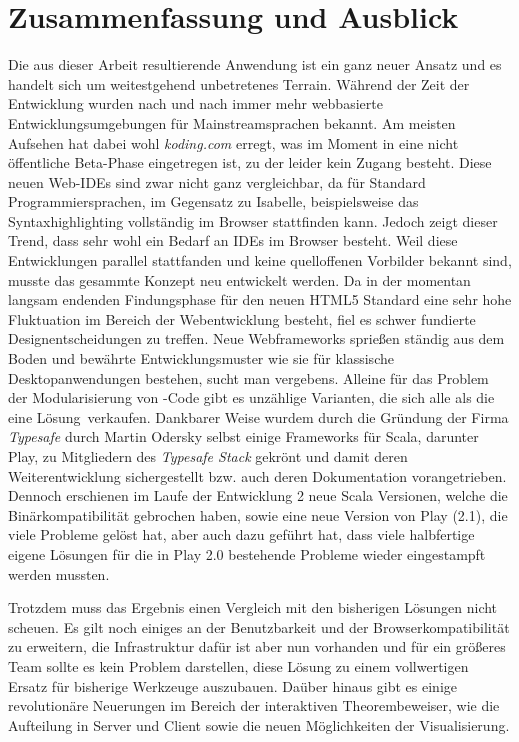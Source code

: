 \chapter{Zusammenfassung und Ausblick}

Die aus dieser Arbeit resultierende Anwendung ist ein ganz neuer Ansatz und es handelt sich um
weitestgehend unbetretenes Terrain. Während der Zeit der Entwicklung wurden nach und nach immer mehr
webbasierte Entwicklungsumgebungen für Mainstreamsprachen bekannt. Am meisten Aufsehen hat dabei
wohl \textit{koding.com} erregt, was im Moment in eine nicht öffentliche Beta-Phase eingetregen ist,
zu der leider kein Zugang besteht. Diese neuen Web-IDEs sind zwar nicht ganz vergleichbar, da für
Standard Programmiersprachen, im Gegensatz zu Isabelle, beispielsweise das Syntaxhighlighting
vollständig im Browser stattfinden kann. Jedoch zeigt dieser Trend, dass sehr wohl ein Bedarf an
IDEs im Browser besteht. Weil diese Entwicklungen parallel stattfanden und keine quelloffenen
Vorbilder bekannt sind, musste das gesammte Konzept neu entwickelt werden. Da in der momentan
langsam endenden Findungsphase für den neuen HTML5 Standard eine sehr hohe Fluktuation im Bereich
der Webentwicklung besteht, fiel es schwer fundierte Designentscheidungen zu treffen. Neue
Webframeworks sprießen ständig aus dem Boden und bewährte Entwicklungsmuster wie sie für klassische
Desktopanwendungen bestehen, sucht man vergebens. Alleine für das Problem der Modularisierung von
-Code gibt es unzählige Varianten, die sich alle als \glqq die eine Lösung\grqq\ verkaufen.
Dankbarer Weise wurdem durch die Gründung der Firma \textit{Typesafe} durch Martin Odersky selbst
einige Frameworks für Scala, darunter Play, zu Mitgliedern des \textit{Typesafe Stack} gekrönt und
damit deren Weiterentwicklung sichergestellt bzw. auch deren Dokumentation vorangetrieben. Dennoch
erschienen im Laufe der Entwicklung 2 neue Scala Versionen, welche die Binärkompatibilität gebrochen
haben, sowie eine neue Version von Play (2.1), die viele Probleme gelöst hat, aber auch dazu geführt
hat, dass viele halbfertige eigene Lösungen für die in Play 2.0 bestehende Probleme wieder
eingestampft werden mussten.

Trotzdem muss das Ergebnis einen Vergleich mit den bisherigen Lösungen nicht scheuen. Es gilt noch
einiges an der Benutzbarkeit und der Browserkompatibilität zu erweitern, die Infrastruktur dafür ist
aber nun vorhanden und für ein größeres Team sollte es kein Problem darstellen, diese Lösung zu
einem vollwertigen Ersatz für bisherige Werkzeuge auszubauen. Daüber hinaus gibt es einige
revolutionäre Neuerungen im Bereich der interaktiven Theorembeweiser, wie die Aufteilung in Server
und Client sowie die neuen Möglichkeiten der Visualisierung.

